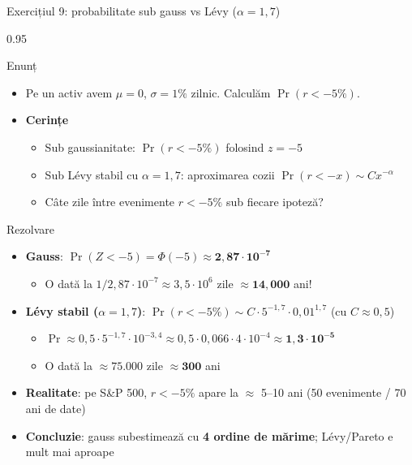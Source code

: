 \documentclass[9pt, aspectratio=169, t]{beamer}
\begin{document}
\begin{frame}[shrink=15]{Exercițiul 9: probabilitate sub gauss vs Lévy ($\alpha=1{,}7$)}
\begin{cminipage}{0.95\textwidth}
\begin{block}{Enunț}
\begin{itemize}\setlength{\itemsep}{0pt}
    \item Pe un activ avem $\mu=0$, $\sigma=1\%$ zilnic. Calculăm $\Pr(r<-5\%)$.
\end{itemize}
\end{block}
\begin{itemize}\setlength{\itemsep}{0pt}
    \item \textbf{Cerințe}
    \begin{itemize}\setlength{\itemsep}{0pt}
        \item Sub gaussianitate: $\Pr(r<-5\%)$ folosind $z=-5$
        \item Sub Lévy stabil cu $\alpha=1{,}7$: aproximarea cozii $\Pr(r<-x)\sim Cx^{-\alpha}$
        \item Câte zile între evenimente $r<-5\%$ sub fiecare ipoteză?
    \end{itemize}
\end{itemize}
\begin{exampleblock}{Rezolvare}
\begin{itemize}\setlength{\itemsep}{0pt}
    \item \textbf{Gauss}: $\Pr(Z<-5)=\Phi(-5)\approx \mathbf{2{,}87\cdot 10^{-7}}$
    \begin{itemize}\setlength{\itemsep}{0pt}
        \item O dată la $1/2{,}87\cdot 10^{-7}\approx 3{,}5\cdot 10^6$ zile $\approx \mathbf{14{,}000}$ ani!
    \end{itemize}
    \item \textbf{Lévy stabil ($\alpha=1{,}7$)}: $\Pr(r<-5\%)\sim C\cdot 5^{-1{,}7}\cdot 0{,}01^{1{,}7}$ (cu $C\approx 0{,}5$)
    \begin{itemize}\setlength{\itemsep}{0pt}
        \item $\Pr\approx 0{,}5\cdot 5^{-1{,}7}\cdot 10^{-3{,}4}\approx 0{,}5\cdot 0{,}066\cdot 4\cdot 10^{-4}\approx \mathbf{1{,}3\cdot 10^{-5}}$
        \item O dată la $\approx 75.000$ zile $\approx \mathbf{300}$ ani
    \end{itemize}
    \item \textbf{Realitate}: pe S\&P 500, $r<-5\%$ apare la $\approx$ 5--10 ani (50 evenimente / 70 ani de date)
    \item \textbf{Concluzie}: gauss subestimează cu \textbf{4 ordine de mărime}; Lévy/Pareto e mult mai aproape
\end{itemize}
\end{exampleblock}
\end{cminipage}
\end{frame}
\end{document}
